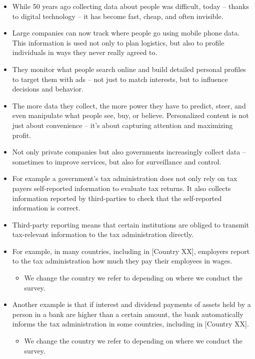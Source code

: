 \documentclass[11pt]{article}
\begin{document}
\begin{itemize}
    \item While 50 years ago collecting data about people was difficult, today – thanks to digital technology – it has become fast, cheap, and often invisible.
    \item Large companies can now track where people go using mobile phone data. This information is used not only to plan logistics, but also to profile individuals in ways they never really agreed to.
    \item They monitor what people search online and build detailed personal profiles to target them with ads – not just to match interests, but to influence decisions and behavior.
    \item The more data they collect, the more power they have to predict, steer, and even manipulate what people see, buy, or believe. Personalized content is not just about convenience – it’s about capturing attention and maximizing profit.
    \item Not only private companies but also governments increasingly collect data – sometimes to improve services, but also for surveillance and control.
    \item For example a government's tax administration does not only rely on tax payers self-reported information to evaluate tax returns. It also collects information reported by third-parties to check that the self-reported information is correct. 
    \item Third-party reporting means that certain institutions are obliged to transmit tax-relevant information to the tax administration directly.
    \item For example, in many countries, including in [Country XX], employers report to the tax administration how much they pay their employees in wages.
    \begin{itemize}
        \item We change the country we refer to depending on where we conduct the survey. 
    \end{itemize}
    \item Another example is that if interest and dividend payments of assets held by a person in a bank are higher than a certain amount, the bank automatically informs the tax administration in some countries, including in [Country XX]. 
    \begin{itemize}
        \item We change the country we refer to depending on where we conduct the survey.
    \end{itemize}

\end{itemize}
\end{document}
